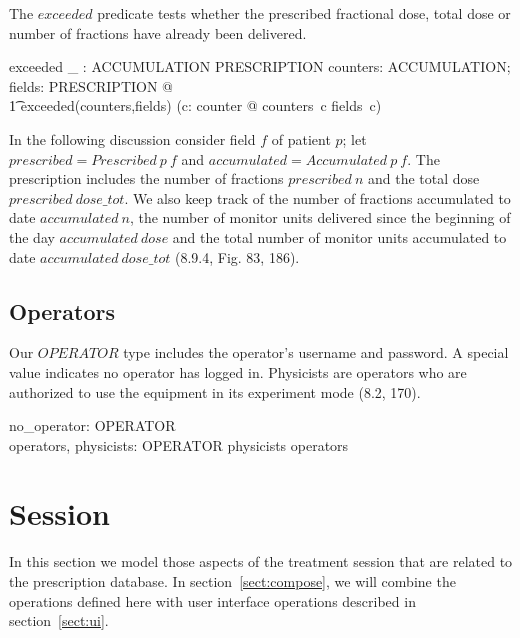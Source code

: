 The $exceeded$ predicate tests whether the prescribed fractional dose,
total dose or number of fractions have already been delivered.


\begin{axdef}
	exceeded \_ : ACCUMULATION \rel PRESCRIPTION
\where
	\forall counters: ACCUMULATION; fields: PRESCRIPTION @ \\
	\t1 exceeded(counters,fields) \iff (\exists c: counter @ counters~c \geq fields~c)
\end{axdef}
In the following discussion consider field $f$ of patient $p$; let
$prescribed = Prescribed~p~f$ and $accumulated = Accumulated~p~f$.
The prescription includes the number of fractions $prescribed~n$ and
the total dose $prescribed~dose\_tot$.  We also keep track of the
number of fractions accumulated to date $accumulated~n$, the number of
monitor units delivered since the beginning of the day
$accumulated~dose$ and the total number of monitor units accumulated
to date $accumulated~dose\_tot$ (8.9.4, Fig. 83, 186).


\subsection{Operators} \label{sect:opers}

Our $OPERATOR$ type includes the operator's username and password.  A
special value indicates no operator has logged in.  Physicists are
operators who are authorized to use the equipment in its experiment
mode (8.2, 170).

\begin{zed} [OPERATOR] \end{zed}

\begin{axdef}
	no\_operator: OPERATOR \\
	operators, physicists: \power OPERATOR
\where
	physicists \subseteq operators
\end{axdef}

\section{Session} \label{sect:session}

In this section we model those aspects of the treatment session that
are related to the prescription database.  In
section~\ref{sect:compose}, we will combine the operations defined
here with user interface operations described in
section~\ref{sect:ui}.

